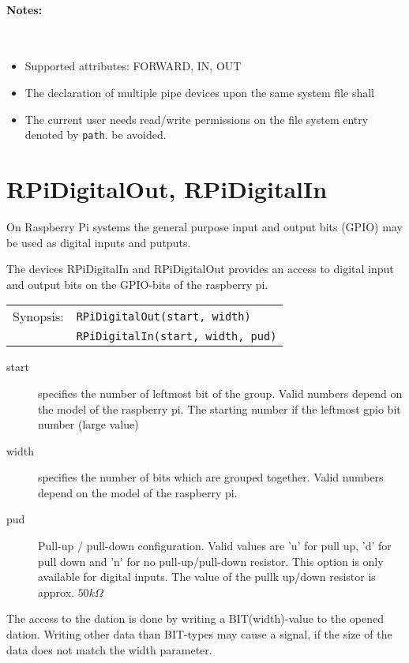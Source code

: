 \paragraph{Notes:} \
\begin{itemize}
\item Supported attributes: FORWARD, IN, OUT
\item The declaration of multiple pipe devices upon the same system file shall
\item The current user needs read/write permissions on the file system entry
   denoted by \texttt{path}.
be avoided.
\end{itemize}

\section{RPiDigitalOut, RPiDigitalIn}
On Raspberry Pi systems the general purpose input and output bits (GPIO)
may be used as digital inputs and putputs.

The devices RPiDigitalIn and  RPiDigitalOut provides 
an access to digital input and output bits
on the GPIO-bits of the raspberry pi.

\begin{tabular}{ll}
Synopsis: & \verb|RPiDigitalOut(start, width)| \\
          & \verb|RPiDigitalIn(start, width, pud)| \\
\end{tabular}

\begin{description}
\item[start] specifies the number of leftmost bit of the group. Valid numbers
     depend on the model of the raspberry pi. The starting number if
     the leftmost gpio bit number (large value)
\item [width] specifies the number of bits which are grouped together.
     Valid numbers depend on the model of the raspberry pi.
\item [pud] Pull-up / pull-down configuration.
    Valid values are 'u' for pull up, 'd' for pull down and 
    'n' for no pull-up/pull-down resistor. This option is only
    available for digital inputs. The value of the pullk up/down resistor is
    approx. $50 k \Omega$
\end{description}

The access to the dation is done by writing a BIT(width)-value to the
opened dation. 
Writing other data than BIT-types  may cause a signal, if the size of the
data does not match the width parameter. 


